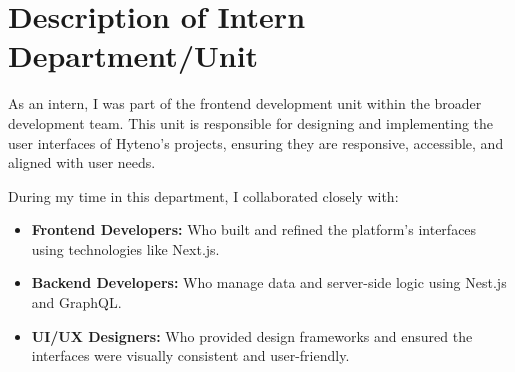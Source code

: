 \section{Description of Intern Department/Unit}
As an intern, I was part of the frontend development unit within the broader development team. This unit is responsible for designing and implementing the user interfaces of Hyteno's projects, ensuring they are responsive, accessible, and aligned with user needs.  

During my time in this department, I collaborated closely with:  
\begin{itemize}
  \item \textbf{Frontend Developers:} Who built and refined the platform's interfaces using technologies like Next.js.  
  \item \textbf{Backend Developers:} Who manage data and server-side logic using Nest.js and GraphQL.  
  \item \textbf{UI/UX Designers:} Who provided design frameworks and ensured the interfaces were visually consistent and user-friendly.  
\end{itemize}


